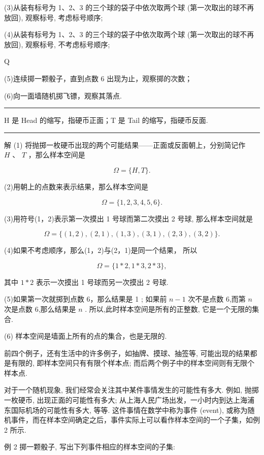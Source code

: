 \documentclass[10pt]{article}
\newcommand{\HRule}{\begin{center}\rule{0.9\linewidth}{0.2mm}\end{center}}
\begin{document}
(3)从装有标号为 1、2、3 的三个球的袋子中依次取两个球 (第一次取出的球不再放回), 观察标号, 考虑标号顺序;

(4)从装有标号为 1、2、3 的三个球的袋子中依次取两个球 (第一次取出的球不再放回), 观察标号, 不考虑标号顺序;

Q

(5)连续掷一颗骰子，直到点数 6 出现为止，观察掷的次数；

(6)向一面墙随机掷飞镖，观察其落点.

\HRule

H 是 Head 的缩写，指硬币正面；T 是 Tail 的缩写，指硬币反面.

\HRule

解 (1) 将抛掷一枚硬币出现的两个可能结果——正面或反面朝上，分别简记作 \(H\text{ 、 }T\) ，那么样本空间是

\[
\Omega  = \{ H,T\} .
\]

(2)用朝上的点数来表示结果，那么样本空间是



\[
\Omega  = \{ 1,2,3,4,5,6\} .
\]

(3)用符号(1，2)表示第一次摸出 1 号球而第二次摸出 2 号球, 那么样本空间就是

\[
\Omega  = \{ \left( {1,2}\right) ,\left( {2,1}\right) ,\left( {1,3}\right) ,\left( {3,1}\right) ,\left( {2,3}\right) ,\left( {3,2}\right) \} .
\]

(4)如果不考虑顺序，那么(1，2)与(2，1)是同一个结果， 所以

\[
\Omega  = \{ 1 * 2,1 * 3,2 * 3\} ,
\]

其中 \(1 * 2\) 表示一次摸出 1 号球而另一次摸出 2 号球.

(5)如果第一次就掷到点数 6，那么结果是 1 ; 如果前 \(n - 1\) 次不是点数 6,而第 \(n\) 次是点数 6,那么结果是 \(n\) . 所以,此时样本空间是所有的正整数, 它是一个无限的集合.

(6) 样本空间是墙面上所有的点的集合，也是无限的.

前四个例子，还有生活中的许多例子，如抽牌、摸球、抽签等, 可能出现的结果都是有限的, 即样本空间只有有限个样本点; 而后两个例子中的样本空间则有无限个样本点.

对于一个随机现象, 我们经常会关注其中某件事情发生的可能性有多大. 例如, 抛掷一枚硬币, 出现正面的可能性有多大; 从上海人民广场出发，一小时内到达上海浦东国际机场的可能性有多大, 等等. 这件事情在数学中称为事件 (event), 或称为随机事件，而在样本空间确定之后，事件实际上可以看作样本空间的一个子集，如例 2 所示.

例 2 掷一颗骰子, 写出下列事件相应的样本空间的子集:
\end{document}
